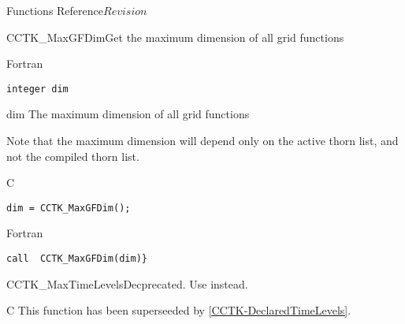 \begin{cactuspart}{ Functions Reference}{}{$Revision$}
\begin{FunctionDescription}{CCTK\_MaxGFDim}{Get the maximum dimension of all grid
    functions }
\begin{SynopsisSection}
\begin{Synopsis}{Fortran}
\begin{verbatim}
integer dim\end{verbatim}
\end{Synopsis}
\end{SynopsisSection}
\begin{ParameterSection}
\begin{Parameter}{dim}
The maximum dimension of all grid functions
\end{Parameter}
\end{ParameterSection}
\begin{Discussion}
Note that the maximum dimension will depend only on the active thorn list,
and not the compiled thorn list.
\end{Discussion}
\begin{ExampleSection}
\begin{Example}{C}
\begin{verbatim}
dim = CCTK_MaxGFDim();
\end{verbatim}
\end{Example}
\begin{Example}{Fortran}
\begin{verbatim}
call  CCTK_MaxGFDim(dim)}
\end{verbatim}
\end{Example}
\end{ExampleSection}
\end{FunctionDescription}

\begin{FunctionDescription}{CCTK\_MaxTimeLevels}{Decprecated. Use  instead.}
\label{CCTK-MaxTimeLevels}
\begin{SynopsisSection}
\begin{Synopsis}{C}
This function has been superseeded by \ref{CCTK-DeclaredTimeLevels}.
\end{Synopsis}
\end{SynopsisSection}
\end{FunctionDescription}


\end{cactuspart}
